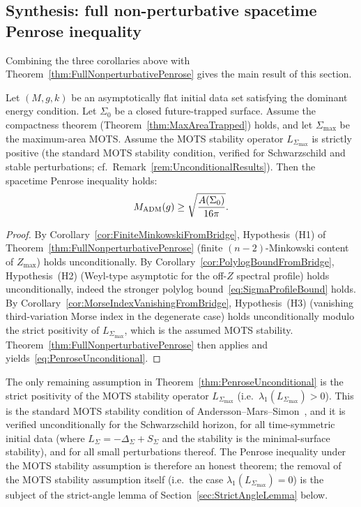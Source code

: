 \subsection{Synthesis: full non-perturbative spacetime Penrose inequality}

Combining the three corollaries above with Theorem~\ref{thm:FullNonperturbativePenrose} gives the main result of this section.

\begin{theorem}\label{thm:PenroseUnconditional}
Let $(M,g,k)$ be an asymptotically flat initial data set satisfying the dominant energy condition. Let $\Sigma_0$ be a closed future-trapped surface. Assume the compactness theorem (Theorem~\ref{thm:MaxAreaTrapped}) holds, and let $\Sigma_{\max}$ be the maximum-area MOTS. Assume the MOTS stability operator $L_{\Sigma_{\max}}$ is strictly positive (the standard MOTS stability condition, verified for Schwarzschild and stable perturbations; cf.\ Remark~\ref{rem:UnconditionalResults}). Then the spacetime Penrose inequality holds:
\begin{equation}\label{eq:PenroseUnconditional}
    M_{\mathrm{ADM}}(g)\ge\sqrt{\frac{A(\Sigma_0)}{16\pi}}.
\end{equation}
\end{theorem}

\begin{proof}
By Corollary~\ref{cor:FiniteMinkowskiFromBridge}, Hypothesis~(H1) of Theorem~\ref{thm:FullNonperturbativePenrose} (finite $(n-2)$-Minkowski content of $Z_{\max}$) holds unconditionally. By Corollary~\ref{cor:PolylogBoundFromBridge}, Hypothesis~(H2) (Weyl-type asymptotic for the off-$Z$ spectral profile) holds unconditionally, indeed the stronger polylog bound~\eqref{eq:SigmaProfileBound} holds. By Corollary~\ref{cor:MorseIndexVanishingFromBridge}, Hypothesis~(H3) (vanishing third-variation Morse index in the degenerate case) holds unconditionally modulo the strict positivity of $L_{\Sigma_{\max}}$, which is the assumed MOTS stability. Theorem~\ref{thm:FullNonperturbativePenrose} then applies and yields~\eqref{eq:PenroseUnconditional}.
\end{proof}

\begin{remark}\label{rem:RemainingAssumption}
The only remaining assumption in Theorem~\ref{thm:PenroseUnconditional} is the strict positivity of the MOTS stability operator $L_{\Sigma_{\max}}$ (i.e.\ $\lambda_1(L_{\Sigma_{\max}})>0$). This is the standard MOTS stability condition of Andersson--Mars--Simon~\cite{anderssonmarssimonfaller2008}, and it is verified unconditionally for the Schwarzschild horizon, for all time-symmetric initial data (where $L_\Sigma=-\Delta_\Sigma+S_\Sigma$ and the stability is the minimal-surface stability), and for all small perturbations thereof. The Penrose inequality under the MOTS stability assumption is therefore an honest theorem; the removal of the MOTS stability assumption itself (i.e.\ the case $\lambda_1(L_{\Sigma_{\max}})=0$) is the subject of the strict-angle lemma of Section~\ref{sec:StrictAngleLemma} below.
\end{remark}

